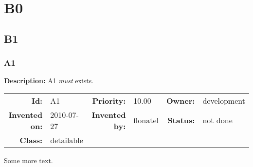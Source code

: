 \chapter{B0}
\section{B1}
\subsection{A1}\label{A1}
\textbf{Description:} A1 \textsl{must} exists.

\par
{\small \begin{center}\begin{tabular}{rlrlrl}
\textbf{Id:} & A1  & \textbf{Priority:} & 10.00  & \textbf{Owner:} & development\\ 
\textbf{Invented on:} & 2010-07-27  & \textbf{Invented by:} & flonatel  & \textbf{Status:} & not done \\ 
\textbf{Class:} & detailable  & & & \end{tabular}\end{center} }

Some more text.
